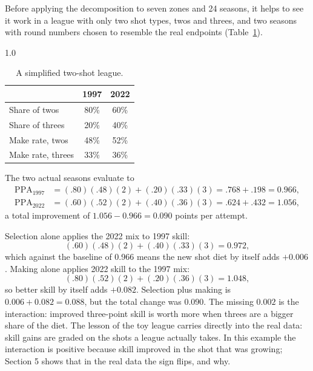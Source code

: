 \documentclass[12pt]{article}
\def\ppa{\mathrm{PPA}}
\begin{document}
Before applying the decomposition to seven zones and 24 seasons, it helps to
see it work in a league with only two shot types, twos and threes, and two
seasons with round numbers chosen to resemble the real endpoints
(Table~\ref{tab:twoshotinputs}).

\begin{table}[ht]
\begin{spacing}{1.0}
\centering
\caption{A simplified two-shot league.}
\label{tab:twoshotinputs}
\begin{tabular}{lcc}
\toprule
                  & 1997 & 2022 \\
\midrule
Share of twos     & 80\% & 60\% \\
Share of threes   & 20\% & 40\% \\
Make rate, twos   & 48\% & 52\% \\
Make rate, threes & 33\% & 36\% \\
\bottomrule
\end{tabular}
\end{spacing}
\end{table}

The two actual seasons evaluate to
\begin{align*}
\ppa_{1997} &= (.80)(.48)(2) + (.20)(.33)(3) = .768 + .198 = 0.966,\\
\ppa_{2022} &= (.60)(.52)(2) + (.40)(.36)(3) = .624 + .432 = 1.056,
\end{align*}
a total improvement of $1.056 - 0.966 = 0.090$ points per attempt.

Selection alone applies the 2022 mix to 1997 skill:
\begin{equation*}
(.60)(.48)(2) + (.40)(.33)(3) = 0.972,
\end{equation*}
which against the baseline of 0.966 means the new shot diet by itself adds
$+0.006$. Making alone applies 2022 skill to the 1997 mix:
\begin{equation*}
(.80)(.52)(2) + (.20)(.36)(3) = 1.048,
\end{equation*}
so better skill by itself adds $+0.082$. Selection plus making is
$0.006 + 0.082 = 0.088$, but the total change was $0.090$. The missing
$0.002$ is the interaction: improved three-point skill is worth more when
threes are a bigger share of the diet. The lesson of the toy league carries
directly into the real data: skill gains are graded on the shots a league
actually takes. In this example the interaction is positive because skill
improved in the shot that was growing; Section 5 shows that in the real data
the sign flips, and why.
\end{document}
